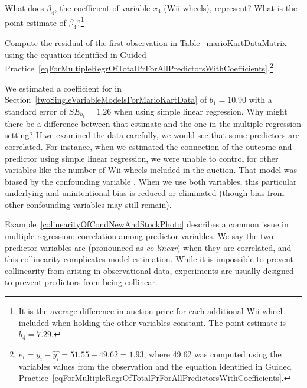 \begin{exercise}
What does $\beta_4$, the coefficient of variable $x_4$ (Wii wheels), represent? What is the point estimate of $\beta_4$?\footnote{It is the average difference in auction price for each additional Wii wheel included when holding the other variables constant. The point estimate is $b_4 = 7.29$.}
\end{exercise}

\begin{exercise} \label{computeMultipleRegressionResidualForMarioKart}
Compute the residual of the first observation in Table~\vref{marioKartDataMatrix} using the equation identified in Guided Practice~\ref{eqForMultipleRegrOfTotalPrForAllPredictorsWithCoefficients}.\footnote{$e_i = y_i - \hat{y_i} = 51.55 - 49.62 = 1.93$, where 49.62 was computed using the variables values from the observation and the equation identified in Guided Practice~\ref{eqForMultipleRegrOfTotalPrForAllPredictorsWithCoefficients}.}
\end{exercise}

\begin{example}{We estimated a coefficient for  in Section~\ref{twoSingleVariableModelsForMarioKartData} of $b_1 = 10.90$ with a standard error of $SE_{b_1} = 1.26$ when using simple linear regression. Why might there be a difference between that estimate and the one in the multiple regression setting?} \label{colinearityOfCondNewAndStockPhoto}
If we examined the data carefully, we would see that some predictors are correlated. For instance, when we estimated the connection of the outcome  and predictor  using simple linear regression, we were unable to control for other variables like the number of Wii wheels included in the auction. That model was biased by the confounding variable . When we use both variables, this particular underlying and unintentional bias is reduced or eliminated (though bias from other confounding variables may still remain).
\end{example}

Example~\ref{colinearityOfCondNewAndStockPhoto} describes a common issue in multiple regression: correlation among predictor variables. We say the two predictor variables are  (pronounced as \emph{co-linear}) when they are correlated, and this collinearity complicates model estimation. While it is impossible to prevent collinearity from arising in observational data, experiments are usually designed to prevent predictors from being collinear.

